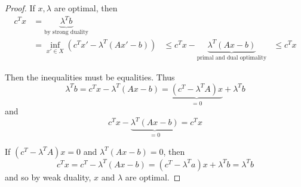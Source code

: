 \begin{proof}
  If $x, \lambda$ are optimal, then
  \begin{align}
    \label{eq:12}
    c^{T} x & = \underbrace{\lambda^{T} b}_{\text{by strong duality}} \\
    &= \inf_{x' \in X} (c^{T} x' - \lambda^{T} (Ax' - b))
    &\leq c^{T} x - \underbrace{\lambda^{T}(Ax - b)}_{\text{primal and
      dual optimality}}
    &\leq c^{T} x
  \end{align}

  Then the inequalities must be equalities. Thus
  \begin{equation}
    \label{eq:17}
    \lambda^{T} b = c^{T} x - \lambda^{T}(Ax - b) = \underbrace{(c^{T} -
      \lambda^{T} A)x}_{=0} + \lambda^{T} b
  \end{equation} and
  \begin{equation}
    \label{eq:18}
    c^{T}x - \underbrace{\lambda^{T}(Ax - b)}_{=0} = c^{T} x
  \end{equation}

  If $(c^{T} -\lambda^{T}A)x = 0$ and $\lambda^{T}(Ax - b) = 0$, then
  \begin{equation}
    \label{eq:19}
    c^{T} x = c^{T} - \lambda^{T}(Ax - b) = (c^{T} - \lambda^{T} a) x
    + \lambda^{T} b = \lambda^{T} b
  \end{equation} and so by weak duality, $x$ and $\lambda$ are
  optimal.
\end{proof}

